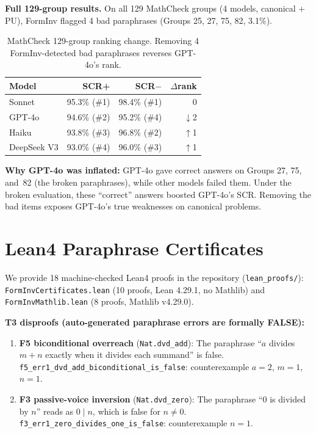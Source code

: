 \documentclass{article}
\begin{document}
\textbf{Full 129-group results.}
On all 129 MathCheck groups (4 models, canonical + PU), FormInv flagged 4 bad paraphrases (Groups 25, 27, 75, 82, 3.1\%).

\begin{table}[h]\centering\small
\caption{MathCheck 129-group ranking change. Removing 4 FormInv-detected bad paraphrases reverses GPT-4o's rank.}
\begin{tabular}{p{2.2cm}rrr}
\toprule
Model & SCR+ & SCR$-$ & $\Delta$rank \\
\midrule
Sonnet & 95.3\% (\#1) & 98.4\% (\#1) & 0 \\
GPT-4o & 94.6\% (\#2) & 95.2\% (\#4) & $\downarrow$2 \\
Haiku  & 93.8\% (\#3) & 96.8\% (\#2) & $\uparrow$1 \\
DeepSeek V3 & 93.0\% (\#4) & 96.0\% (\#3) & $\uparrow$1 \\
\bottomrule
\end{tabular}
\end{table}

\noindent\textbf{Why GPT-4o was inflated:} GPT-4o gave correct answers on Groups 27, 75, and~82 (the broken paraphrases), while other models failed them. Under the broken evaluation, these ``correct'' answers boosted GPT-4o's SCR. Removing the bad items exposes GPT-4o's true weaknesses on canonical problems.

\section{Lean4 Paraphrase Certificates}
\label{app:lean4}

We provide 18 machine-checked Lean4 proofs in the repository (\texttt{lean\_proofs/}):
\texttt{FormInvCertificates.lean} (10 proofs, Lean 4.29.1, no Mathlib) and
\texttt{FormInvMathlib.lean} (8 proofs, Mathlib v4.29.0).

\textbf{T3 disproofs (auto-generated paraphrase errors are formally FALSE):}
\begin{enumerate}[leftmargin=*,itemsep=2pt]
\item \textbf{F5 biconditional overreach} (\texttt{Nat.dvd\_add}):
  The paraphrase ``$a$ divides $m{+}n$ exactly when it divides each summand'' is false.
  \texttt{f5\_err1\_dvd\_add\_biconditional\_is\_false}: counterexample $a{=}2$, $m{=}1$, $n{=}1$.

\item \textbf{F3 passive-voice inversion} (\texttt{Nat.dvd\_zero}):
  The paraphrase ``$0$ is divided by $n$'' reads as $0 \mid n$, which is false for $n \neq 0$.
  \texttt{f3\_err1\_zero\_divides\_one\_is\_false}: counterexample $n{=}1$.
\end{enumerate}
\end{document}
